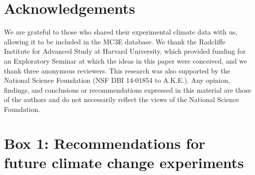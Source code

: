 \documentclass{article}
\begin{document}
 \section* {Acknowledgements}
We are grateful to those who shared their experimental climate data with us, allowing it to be included in the MC3E database. We thank the Radcliffe Institute for Advanced Study at Harvard University, which provided funding for an Exploratory Seminar at which the ideas in this paper were conceived, and we thank three anonymous reviewers. This research was also supported by the National Science Foundation (NSF DBI 14-01854 to A.K.E.). Any opinion, findings, and conclusions or recommendations expressed in this material are those of the authors and do not necessarily reflect the views of the National Science Foundation.

\section* {Box 1: Recommendations for future climate change experiments} 
\end{document}
